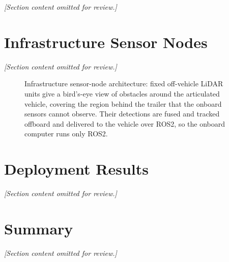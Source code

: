\textit{[Section content omitted for review.]}

\section{Infrastructure Sensor Nodes}
\label{sec:sensor_nodes}
\textit{[Section content omitted for review.]}

\begin{figure}[H]
    \centering
    \caption{Infrastructure sensor-node architecture: fixed off-vehicle LiDAR units give a bird's-eye view of obstacles around the articulated vehicle, covering the region behind the trailer that the onboard sensors cannot observe. Their detections are fused and tracked offboard and delivered to the vehicle over ROS2, so the onboard computer runs only ROS2.}
    \label{fig:sensor_nodes}
\end{figure}

\section{Deployment Results}
\textit{[Section content omitted for review.]}

\section{Summary}
\textit{[Section content omitted for review.]}
